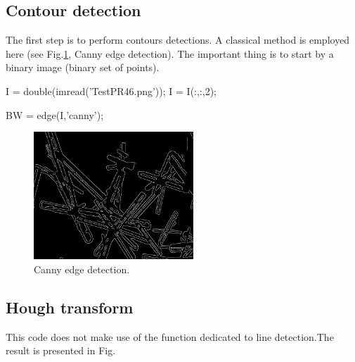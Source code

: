\def\QRCODE{TB_IPR_TUT.IMG.hough_matlabqrcode.png}
\def\QRPAGE{http://www.iptutorials.science/tree/master/TB_IPR/TUT.IMG.hough/matlab}

\subsection{Contour detection}


The first step is to perform contours detections. A classical method is employed here (see Fig.\ref{fig:tutorial:hough:matlab:canny}, Canny edge detection). The important thing is to start by a binary image (binary set of points).
\begin{matlab}
I  = double(imread('TestPR46.png'));
I = I(:,:,2); %

BW = edge(I,'canny');
\end{matlab}

\begin{figure}[htbp]
 \centering
 \includegraphics[width=6cm]{canny.png}
 \caption{Canny edge detection.}
 \label{fig:tutorial:hough:matlab:canny}
\end{figure}

\subsection{Hough transform}
This code does not make use of the \matlabregistered{} function dedicated to line detection.The result is presented in Fig.%

